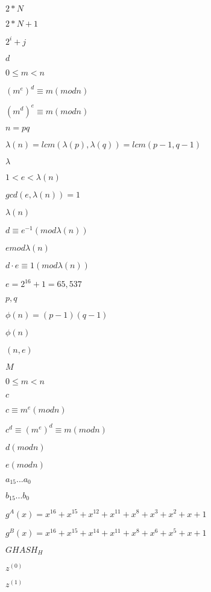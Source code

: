 \documentclass{article}
\begin{document}
$ 2*N $
\pagebreak

$ 2*N + 1 $
\pagebreak

$ {2}^{i} + j $
\pagebreak

$ d$
\pagebreak

$ 0 \leq m < n$
\pagebreak

$ {({m}^{e})}^{d} \equiv m (mod n)$
\pagebreak

$ {({m}^{d})}^{e} \equiv m ( mod n )$
\pagebreak

$ n = pq$
\pagebreak

$ \lambda(n) = lcm(\lambda(p), \lambda(q)) = lcm(p−1, q−1)$
\pagebreak

$ \lambda$
\pagebreak

$ 1 < e < \lambda(n)$
\pagebreak

$ gcd(e, \lambda(n)) = 1$
\pagebreak

$ \lambda(n)$
\pagebreak

$ d \equiv {e}^{−1} (mod \lambda(n))$
\pagebreak

$ e mod \lambda(n)$
\pagebreak

$ d \cdot e \equiv 1 (mod \lambda(n))$
\pagebreak

$ e = {2}^{16} + 1 = 65,537$
\pagebreak

$ p, q$
\pagebreak

$ \phi(n) = (p − 1)(q − 1)$
\pagebreak

$ \phi(n)$
\pagebreak

$ (n, e)$
\pagebreak

$ M$
\pagebreak

$ 0 ≤ m < n$
\pagebreak

$ c$
\pagebreak

$ c \equiv {m}^{e} (mod n)$
\pagebreak

$ {c}^{d} \equiv {({m}^{e})}^{d} \equiv m (mod n)$
\pagebreak

$ d (mod n)$
\pagebreak

$ e (mod n)$
\pagebreak

$ {a}_{15}...{a}_{0} $
\pagebreak

$ {b}_{15}...{b}_{0} $
\pagebreak

$ {g}^{A}(x) = {x}^{16}+{x}^{15}+{x}^{12}+{x}^{11}+{x}^{8}+{x}^{3}+{x}^{2}+x+1 $
\pagebreak

$ {g}^{B}(x) = {x}^{16}+{x}^{15}+{x}^{14}+{x}^{11}+{x}^{8}+{x}^{6}+{x}^{5}+x+1 $
\pagebreak

$ {GHASH}_{H} $
\pagebreak

$ {z}^{(0)} $
\pagebreak

$ {z}^{(1)} $
\pagebreak
\end{document}
